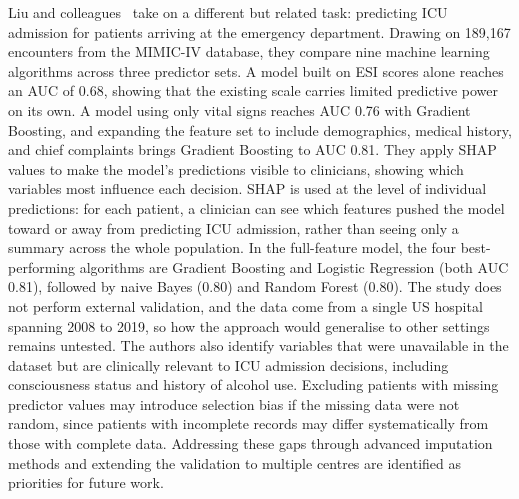 \documentclass[11pt]{article}
\begin{document}
Liu and colleagues~\cite{Liu2025} take on a different but related task: predicting ICU admission for patients arriving at the emergency department. Drawing on 189,167 encounters from the MIMIC-IV database, they compare nine machine learning algorithms across three predictor sets. A model built on ESI scores alone reaches an AUC of 0.68, showing that the existing scale carries limited predictive power on its own. A model using only vital signs reaches AUC 0.76 with Gradient Boosting, and expanding the feature set to include demographics, medical history, and chief complaints brings Gradient Boosting to AUC 0.81. They apply SHAP values to make the model's predictions visible to clinicians, showing which variables most influence each decision. SHAP is used at the level of individual predictions: for each patient, a clinician can see which features pushed the model toward or away from predicting ICU admission, rather than seeing only a summary across the whole population. In the full-feature model, the four best-performing algorithms are Gradient Boosting and Logistic Regression (both AUC 0.81), followed by naive Bayes (0.80) and Random Forest (0.80). The study does not perform external validation, and the data come from a single US hospital spanning 2008 to 2019, so how the approach would generalise to other settings remains untested. The authors also identify variables that were unavailable in the dataset but are clinically relevant to ICU admission decisions, including consciousness status and history of alcohol use. Excluding patients with missing predictor values may introduce selection bias if the missing data were not random, since patients with incomplete records may differ systematically from those with complete data. Addressing these gaps through advanced imputation methods and extending the validation to multiple centres are identified as priorities for future work.
\end{document}
